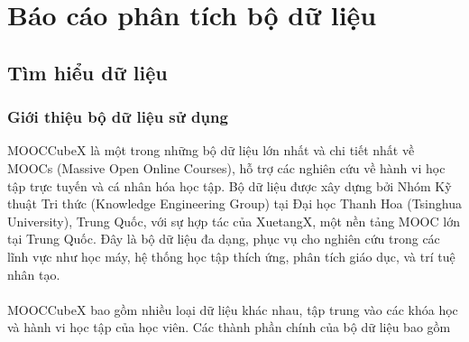 \section{Báo cáo phân tích bộ dữ liệu}
\subsection{Tìm hiểu dữ liệu}
\subsubsection{Giới thiệu bộ dữ liệu sử dụng}
MOOCCubeX là một trong những bộ dữ liệu lớn nhất và chi tiết nhất về MOOCs (Massive Open Online Courses), hỗ trợ các nghiên cứu về hành vi học tập trực tuyến và cá nhân hóa học tập. Bộ dữ liệu được xây dựng bởi Nhóm Kỹ thuật Tri thức (Knowledge Engineering Group) tại Đại học Thanh Hoa (Tsinghua University), Trung Quốc, với sự hợp tác của XuetangX, một nền tảng MOOC lớn tại Trung Quốc. Đây là bộ dữ liệu đa dạng, phục vụ cho nghiên cứu trong các lĩnh vực như học máy, hệ thống học tập thích ứng, phân tích giáo dục, và trí tuệ nhân tạo.\\
\\
MOOCCubeX bao gồm nhiều loại dữ liệu khác nhau, tập trung vào các khóa học và hành vi học tập của học viên. Các thành phần chính của bộ dữ liệu bao gồm\\
